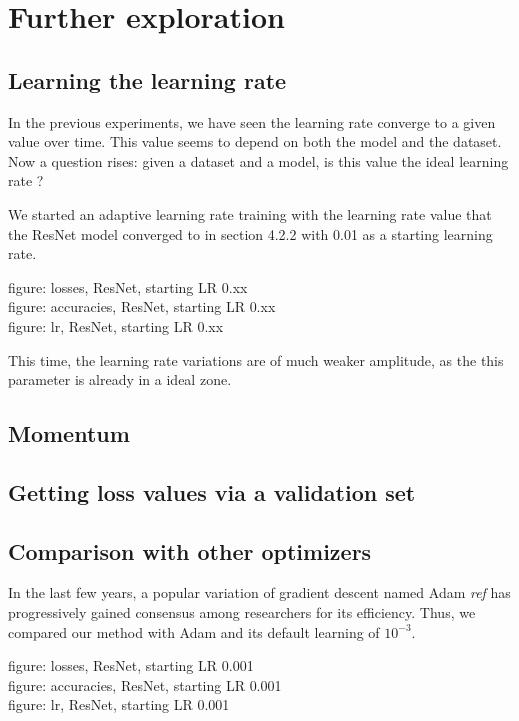 \documentclass{article}
\begin{document}
  \section{Further exploration}
  
  \subsection{Learning the learning rate}
  
  In the previous experiments, we have seen the learning rate converge to a given value over time. This value seems to depend on both the model and the dataset. Now a question rises: given a dataset and a model, is this value the ideal learning rate ?
  
  We started an adaptive learning rate training with the learning rate value that the ResNet model converged to in section 4.2.2 with 0.01 as a starting learning rate. 
  
  figure: losses, ResNet, starting LR 0.xx\\
  figure: accuracies, ResNet, starting LR 0.xx\\
  figure: lr, ResNet, starting LR 0.xx
  
  This time, the learning rate variations are of much weaker amplitude, as the this parameter is already in a ideal zone. 
  
  \subsection{Momentum}
  
  \subsection{Getting loss values via a validation set}
  
  \subsection{Comparison with other optimizers}
  
  In the last few years, a popular variation of gradient descent named Adam \emph{ref} has progressively gained consensus among researchers for its efficiency. Thus, we compared our method with Adam and its default learning of $10^{-3}$. 

  figure: losses, ResNet, starting LR 0.001\\
  figure: accuracies, ResNet, starting LR 0.001\\
  figure: lr, ResNet, starting LR 0.001
  
\end{document}
